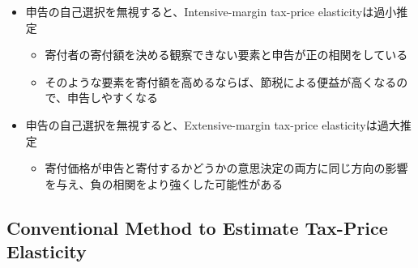 \documentclass[
  11pt,
  a4paper,
]{article}
\providecommand{\tightlist}{%
  \setlength{\itemsep}{0pt}\setlength{\parskip}{0pt}}
\begin{document}
\begin{itemize}
\tightlist
\item
  申告の自己選択を無視すると、Intensive-margin tax-price elasticityは過小推定

  \begin{itemize}
  \tightlist
  \item
    寄付者の寄付額を決める観察できない要素と申告が正の相関をしている
  \item
    そのような要素を寄付額を高めるならば、節税による便益が高くなるので、申告しやすくなる
  \end{itemize}
\item
  申告の自己選択を無視すると、Extensive-margin tax-price elasticityは過大推定

  \begin{itemize}
  \tightlist
  \item
    寄付価格が申告と寄付するかどうかの意思決定の両方に同じ方向の影響を与え、負の相関をより強くした可能性がある
  \end{itemize}
\end{itemize}

\hypertarget{conventional-method-to-estimate-tax-price-elasticity}{%
\subsection{Conventional Method to Estimate Tax-Price Elasticity}\label{conventional-method-to-estimate-tax-price-elasticity}}
\end{document}
